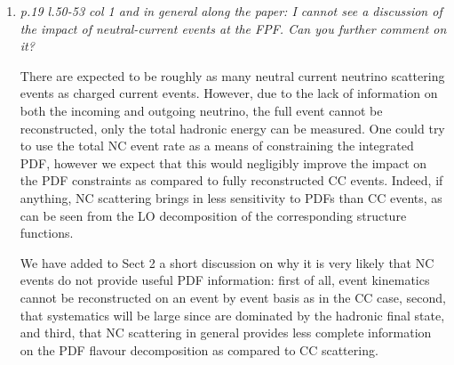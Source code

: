 \documentclass[11pt,a4paper]{article}
\begin{document}
\begin{enumerate}
\item{\it p.19 l.50-53 col 1 and in general along the paper: I cannot see a discussion of the impact of neutral-current events at the FPF. Can you further comment on it?}

  There are expected to be roughly as many neutral current neutrino scattering events as charged current events. However, due to the lack of information on both the incoming and outgoing neutrino, the full event cannot be reconstructed, only the total hadronic energy can be measured. One could try to use the total NC event rate as a means of constraining the integrated PDF, however we expect that this would negligibly improve the impact on the PDF constraints as compared to fully reconstructed CC events. Indeed, if anything, NC scattering brings in less sensitivity to PDFs than CC events, as can be seen from the LO decomposition of the corresponding structure functions.

  We have added to Sect 2 a short discussion on why it is very likely that NC events do not provide useful PDF information: first of all, event kinematics cannot be reconstructed on an event by event basis as in the CC case, second, that systematics will be large since are dominated by the hadronic final state, and third, that NC scattering in general provides less complete information on the PDF flavour decomposition as compared to CC scattering. 

\end{enumerate}
	
\end{document}
